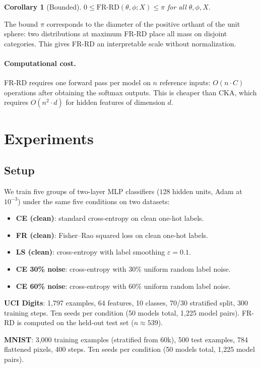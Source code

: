 \documentclass[11pt]{article}
\newtheorem{corollary}{Corollary}
\begin{document}
\begin{corollary}[Bounded]
$0 \le \mathrm{FR\text{-}RD}(\theta, \phi; X) \le \pi$ for all $\theta, \phi, X$.
\end{corollary}

The bound $\pi$ corresponds to the diameter of the positive orthant of the unit sphere: two
distributions at maximum FR-RD place all mass on disjoint categories. This gives FR-RD an
interpretable scale without normalization.

\paragraph{Computational cost.} FR-RD requires one forward pass per model on $n$ reference
inputs: $O(n \cdot C)$ operations after obtaining the softmax outputs. This is cheaper than
CKA, which requires $O(n^2 \cdot d)$ for hidden features of dimension $d$.

\section{Experiments}

\subsection{Setup}

We train five groups of two-layer MLP classifiers ($128$ hidden units, Adam at $10^{-3}$)
under the same five conditions on two datasets:
\begin{itemize}
  \item \textbf{CE (clean)}: standard cross-entropy on clean one-hot labels.
  \item \textbf{FR (clean)}: Fisher--Rao squared loss on clean one-hot labels.
  \item \textbf{LS (clean)}: cross-entropy with label smoothing $\varepsilon = 0.1$.
  \item \textbf{CE 30\% noise}: cross-entropy with $30\%$ uniform random label noise.
  \item \textbf{CE 60\% noise}: cross-entropy with $60\%$ uniform random label noise.
\end{itemize}

\textbf{UCI Digits}: 1,797 examples, 64 features, 10 classes, 70/30 stratified split,
300 training steps. Ten seeds per condition (50 models total, 1,225 model pairs).
FR-RD is computed on the held-out test set ($n \approx 539$).

\textbf{MNIST}: 3,000 training examples (stratified from 60k), 500 test examples, 784
flattened pixels, 400 steps. Ten seeds per condition (50 models total, 1,225 model pairs).
\end{document}
